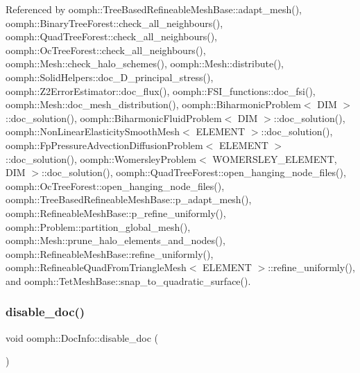 Referenced by oomph\+::\+Tree\+Based\+Refineable\+Mesh\+Base\+::adapt\+\_\+mesh(), oomph\+::\+Binary\+Tree\+Forest\+::check\+\_\+all\+\_\+neighbours(), oomph\+::\+Quad\+Tree\+Forest\+::check\+\_\+all\+\_\+neighbours(), oomph\+::\+Oc\+Tree\+Forest\+::check\+\_\+all\+\_\+neighbours(), oomph\+::\+Mesh\+::check\+\_\+halo\+\_\+schemes(), oomph\+::\+Mesh\+::distribute(), oomph\+::\+Solid\+Helpers\+::doc\+\_\+D\+\_\+principal\+\_\+stress(), oomph\+::\+Z2\+Error\+Estimator\+::doc\+\_\+flux(), oomph\+::\+F\+S\+I\+\_\+functions\+::doc\+\_\+fsi(), oomph\+::\+Mesh\+::doc\+\_\+mesh\+\_\+distribution(), oomph\+::\+Biharmonic\+Problem$<$ D\+I\+M $>$\+::doc\+\_\+solution(), oomph\+::\+Biharmonic\+Fluid\+Problem$<$ D\+I\+M $>$\+::doc\+\_\+solution(), oomph\+::\+Non\+Linear\+Elasticity\+Smooth\+Mesh$<$ E\+L\+E\+M\+E\+N\+T $>$\+::doc\+\_\+solution(), oomph\+::\+Fp\+Pressure\+Advection\+Diffusion\+Problem$<$ E\+L\+E\+M\+E\+N\+T $>$\+::doc\+\_\+solution(), oomph\+::\+Womersley\+Problem$<$ W\+O\+M\+E\+R\+S\+L\+E\+Y\+\_\+\+E\+L\+E\+M\+E\+N\+T, D\+I\+M $>$\+::doc\+\_\+solution(), oomph\+::\+Quad\+Tree\+Forest\+::open\+\_\+hanging\+\_\+node\+\_\+files(), oomph\+::\+Oc\+Tree\+Forest\+::open\+\_\+hanging\+\_\+node\+\_\+files(), oomph\+::\+Tree\+Based\+Refineable\+Mesh\+Base\+::p\+\_\+adapt\+\_\+mesh(), oomph\+::\+Refineable\+Mesh\+Base\+::p\+\_\+refine\+\_\+uniformly(), oomph\+::\+Problem\+::partition\+\_\+global\+\_\+mesh(), oomph\+::\+Mesh\+::prune\+\_\+halo\+\_\+elements\+\_\+and\+\_\+nodes(), oomph\+::\+Refineable\+Mesh\+Base\+::refine\+\_\+uniformly(), oomph\+::\+Refineable\+Quad\+From\+Triangle\+Mesh$<$ E\+L\+E\+M\+E\+N\+T $>$\+::refine\+\_\+uniformly(), and oomph\+::\+Tet\+Mesh\+Base\+::snap\+\_\+to\+\_\+quadratic\+\_\+surface().

\mbox{\label{classoomph_1_1DocInfo_a666a20817ab9c396b225d8652bc0a338}} 
\subsubsection{\texorpdfstring{disable\+\_\+doc()}{disable\_doc()}}
{\footnotesize\ttfamily void oomph\+::\+Doc\+Info\+::disable\+\_\+doc (\begin{DoxyParamCaption}{ }\end{DoxyParamCaption})\hspace{0.3cm}{\ttfamily [inline]}}



